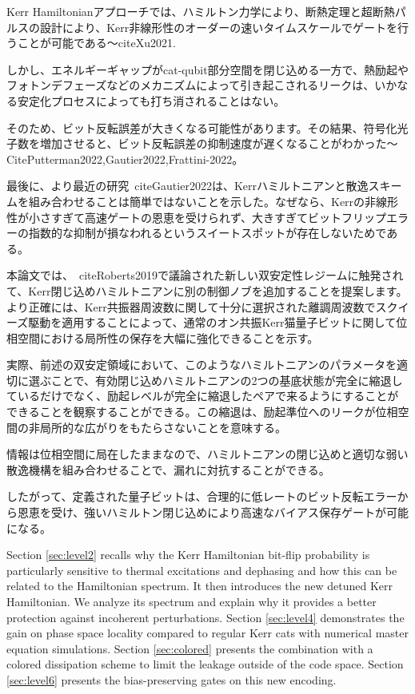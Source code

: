 Kerr Hamiltonianアプローチでは、ハミルトン力学により、断熱定理と超断熱パルスの設計により、Kerr非線形性のオーダーの速いタイムスケールでゲートを行うことが可能である〜cite{Xu2021}. 

しかし、エネルギーギャップがcat-qubit部分空間を閉じ込める一方で、熱励起やフォトンデフェーズなどのメカニズムによって引き起こされるリークは、いかなる安定化プロセスによっても打ち消されることはない。

そのため、ビット反転誤差が大きくなる可能性があります。その結果、符号化光子数を増加させると、ビット反転誤差の抑制速度が遅くなることがわかった〜Cite{Putterman2022,Gautier2022,Frattini-2022}。

最後に、より最近の研究~cite{Gautier2022}は、Kerrハミルトニアンと散逸スキームを組み合わせることは簡単ではないことを示した。なぜなら、Kerrの非線形性が小さすぎて高速ゲートの恩恵を受けられず、大きすぎてビットフリップエラーの指数的な抑制が損なわれるというスイートスポットが存在しないためである。  


本論文では、~cite{Roberts2019}で議論された新しい双安定性レジームに触発されて、Kerr閉じ込めハミルトニアンに別の制御ノブを追加することを提案します。より正確には、Kerr共振器周波数に関して十分に選択された離調周波数でスクイーズ駆動を適用することによって、通常のオン共振Kerr猫量子ビットに関して位相空間における局所性の保存を大幅に強化できることを示す。


実際、前述の双安定領域において、このようなハミルトニアンのパラメータを適切に選ぶことで、有効閉じ込めハミルトニアンの2つの基底状態が完全に縮退しているだけでなく、励起レベルが完全に縮退したペアで来るようにすることができることを観察することができる。この縮退は、励起準位へのリークが位相空間の非局所的な広がりをもたらさないことを意味する。


情報は位相空間に局在したままなので、ハミルトニアンの閉じ込めと適切な弱い散逸機構を組み合わせることで、漏れに対抗することができる。


したがって、定義された量子ビットは、合理的に低レートのビット反転エラーから恩恵を受け、強いハミルトン閉じ込めにより高速なバイアス保存ゲートが可能になる。



Section \ref{sec:level2} recalls why the Kerr Hamiltonian bit-flip probability is particularly sensitive to thermal excitations and dephasing and how this can be related to the Hamiltonian spectrum. It then introduces the new detuned Kerr Hamiltonian. We analyze its spectrum and explain why it provides a better protection against incoherent perturbations. Section \ref{sec:level4} demonstrates the gain on phase space locality compared to regular Kerr cats with numerical master equation simulations. Section \ref{sec:colored} presents the combination with a colored dissipation scheme to limit the leakage outside of the code space. Section \ref{sec:level6} presents the bias-preserving gates on this new encoding.

